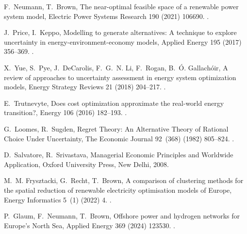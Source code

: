 \documentclass[preprint,12pt,sort&compress]{elsarticle}
\begin{document}
\begin{thebibliography}{10}
F.~Neumann, T.~Brown, The near-optimal feasible space of a renewable power system model, Electric Power Systems Research 190 (2021) 106690.
\newblock \href {https://doi.org/10.1016/j.epsr.2020.106690} {}.

J.~Price, I.~Keppo, Modelling to generate alternatives: {{A}} technique to explore uncertainty in energy-environment-economy models, Applied Energy 195 (2017) 356--369.
\newblock \href {https://doi.org/10.1016/j.apenergy.2017.03.065} {}.

X.~Yue, S.~Pye, J.~DeCarolis, F.~G.~N. Li, F.~Rogan, B.~{\'O}. Gallach{\'o}ir, A review of approaches to uncertainty assessment in energy system optimization models, Energy Strategy Reviews 21 (2018) 204--217.
\newblock \href {https://doi.org/10.1016/j.esr.2018.06.003} {}.

E.~Trutnevyte, Does cost optimization approximate the real-world energy transition?, Energy 106 (2016) 182--193.
\newblock \href {https://doi.org/10.1016/j.energy.2016.03.038} {}.

G.~Loomes, R.~Sugden, Regret {{Theory}}: {{An Alternative Theory}} of {{Rational Choice Under Uncertainty}}, The Economic Journal 92~(368) (1982) 805--824.
\newblock \href {https://doi.org/10.2307/2232669} {}.

D.~Salvatore, R.~Srivastava, Managerial Economic Principles and Worldwide Application, Oxford University Press, New Delhi, 2008.

M.~M. Frysztacki, G.~Recht, T.~Brown, A comparison of clustering methods for the spatial reduction of renewable electricity optimisation models of {{Europe}}, Energy Informatics 5~(1) (2022) 4.
\newblock \href {https://doi.org/10.1186/s42162-022-00187-7} {}.

P.~Glaum, F.~Neumann, T.~Brown, Offshore power and hydrogen networks for {{Europe}}'s {{North Sea}}, Applied Energy 369 (2024) 123530.
\newblock \href {https://doi.org/10.1016/j.apenergy.2024.123530} {}.


\end{thebibliography}
\end{document}
